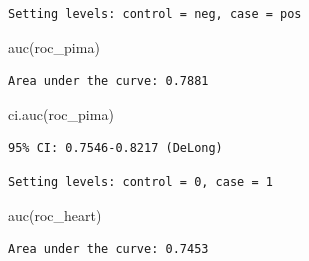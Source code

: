 \documentclass[
  letterpaper,
  DIV=11,
  numbers=noendperiod]{scrreprt}
\newenvironment{Shaded}{\begin{snugshade}}{\end{snugshade}}
\newcommand{\AttributeTok}[1]{\textcolor[rgb]{0.40,0.45,0.13}{#1}}
\newcommand{\CommentTok}[1]{\textcolor[rgb]{0.37,0.37,0.37}{#1}}
\newcommand{\FunctionTok}[1]{\textcolor[rgb]{0.28,0.35,0.67}{#1}}
\newcommand{\NormalTok}[1]{\textcolor[rgb]{0.00,0.23,0.31}{#1}}
\newcommand{\OtherTok}[1]{\textcolor[rgb]{0.00,0.23,0.31}{#1}}
\newcommand{\SpecialCharTok}[1]{\textcolor[rgb]{0.37,0.37,0.37}{#1}}
\newcommand{\StringTok}[1]{\textcolor[rgb]{0.13,0.47,0.30}{#1}}
\begin{document}
\begin{verbatim}
Setting levels: control = neg, case = pos
\end{verbatim}

\begin{Shaded}
\begin{Highlighting}[]
\FunctionTok{auc}\NormalTok{(roc\_pima)}
\end{Highlighting}
\end{Shaded}

\begin{verbatim}
Area under the curve: 0.7881
\end{verbatim}

\begin{Shaded}
\begin{Highlighting}[]
\FunctionTok{ci.auc}\NormalTok{(roc\_pima)}
\end{Highlighting}
\end{Shaded}

\begin{verbatim}
95% CI: 0.7546-0.8217 (DeLong)
\end{verbatim}

\begin{Shaded}
\end{Shaded}

\begin{verbatim}
Setting levels: control = 0, case = 1
\end{verbatim}

\begin{Shaded}
\begin{Highlighting}[]
\FunctionTok{auc}\NormalTok{(roc\_heart)}
\end{Highlighting}
\end{Shaded}

\begin{verbatim}
Area under the curve: 0.7453
\end{verbatim}
\end{document}
